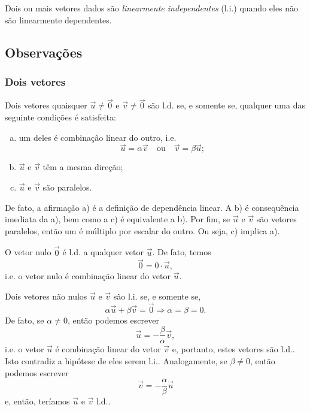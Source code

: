 Dois ou mais vetores dados são \emph{linearmente independentes} (l.i.) quando eles não são linearmente dependentes.

\subsection{Observações}\label{cap_base_sec_deplin_subsec_obs}

\subsubsection{Dois vetores}

Dois vetores quaisquer $\vec{u}\neq\vec{0}$ e $\vec{v}\neq\vec{0}$ são l.d. se, e somente se, qualquer uma das seguinte condições é satisfeita:
\begin{enumerate}[a)]
\item um deles é combinação linear do outro, i.e.
  \begin{equation}
    \vec{u} = \alpha\vec{v}\quad\text{ou}\quad\vec{v}=\beta\vec{u};
  \end{equation}
\item $\vec{u}$ e $\vec{v}$ têm a mesma direção;
\item $\vec{u}$ e $\vec{v}$ são paralelos.
\end{enumerate}
De fato, a afirmação a) é a definição de dependência linear. A b) é consequência imediata da a), bem como a c) é equivalente a b). Por fim, se $\vec{u}$ e $\vec{v}$ são vetores paralelos, então um é múltiplo por escalar do outro. Ou seja, c) implica a).

\begin{obs}
  O vetor nulo $\vec{0}$ é l.d. a qualquer vetor $\vec{u}$. De fato, temos
  \begin{equation}
    \vec{0} = 0\cdot\vec{u},
  \end{equation}
  i.e. o vetor nulo é combinação linear do vetor $\vec{u}$.
\end{obs}

\begin{obs}
  Dois vetores não nulos $\vec{u}$ e $\vec{v}$ são l.i. se, e somente se,
  \begin{equation}
    \alpha\vec{u} + \beta\vec{v} = \vec{0} \Rightarrow \alpha=\beta=0.
  \end{equation}
  De fato, se $\alpha\neq 0$, então podemos escrever
  \begin{equation}
    \vec{u} = -\frac{\beta}{\alpha}\vec{v},
  \end{equation}
  i.e. o vetor $\vec{u}$ é combinação linear do vetor $\vec{v}$ e, portanto, estes vetores são l.d.. Isto contradiz a hipótese de eles serem l.i.. Analogamente, se $\beta \neq 0$, então podemos escrever
  \begin{equation}
    \vec{v} = -\frac{\alpha}{\beta}\vec{u}
  \end{equation}
  e, então, teríamos $\vec{u}$ e $\vec{v}$ l.d..
\end{obs}


